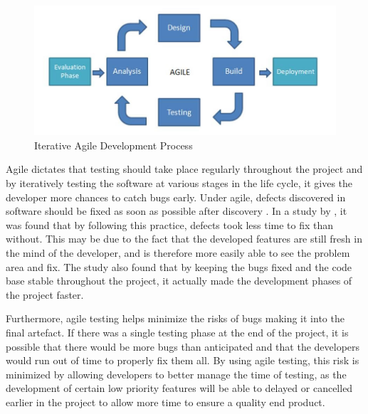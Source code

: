 \begin{figure}[ht]
	\centering
	\includegraphics[scale=0.4]{images/Agile_Image.jpg}
	\caption{Iterative Agile Development Process}
	\label{fig:agile}
\end{figure}

Agile dictates that testing should take place regularly throughout the project and by iteratively testing the software at various stages in the life cycle, it gives the developer more chances to catch bugs early.
Under agile, defects discovered in software should be fixed as soon as possible after discovery \citep{beck2001agile}.
In a study by \cite{talby2006}, it was found that by following this practice, defects took less time to fix than without.
This may be due to the fact that the developed features are still fresh in the mind of the developer, and is therefore more easily able to see the problem area and fix.
The study also found that by keeping the bugs fixed and the code base stable throughout the project, it actually made the development phases of the project faster.

Furthermore, agile testing helps minimize the risks of bugs making it into the final artefact. 
If there was a single testing phase at the end of the project, it is possible that there would be more bugs than anticipated and that the developers would run out of time to properly fix them all. 
By using agile testing, this risk is minimized by allowing developers to better manage the time of testing, as the development of certain low priority features will be able to delayed or cancelled earlier in the project to allow more time to ensure a quality end product.

